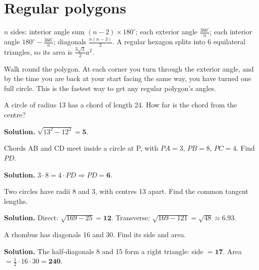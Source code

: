 \documentclass[11pt,a4paper,openany]{report}
\begin{document}
\section{Regular polygons}
$n$ sides: interior angle sum $(n-2)\times180^\circ$; each exterior angle $\frac{360^\circ}n$; each interior angle $180^\circ-\frac{360^\circ}n$; diagonals $\frac{n(n-3)}2$. A regular hexagon splits into 6 equilateral triangles, so its area is $\frac{3\sqrt3}2a^2$.

\begin{why}
Walk round the polygon. At each corner you turn through the exterior angle, and by the time you are back at your start facing the same way, you have turned one full circle. This is the fastest way to get any regular polygon's angles.
\end{why}

\begin{example}[chord]
A circle of radius 13 has a chord of length 24. How far is the chord from the centre?

\textbf{Solution.} $\sqrt{13^2-12^2}=\mathbf{5}$.
\end{example}

\begin{example}
Chords AB and CD meet inside a circle at P, with $PA=3$, $PB=8$, $PC=4$. Find $PD$.

\textbf{Solution.} $3\cdot8=4\cdot PD\Rightarrow PD=\mathbf{6}$.
\end{example}

\begin{example}
Two circles have radii 8 and 3, with centres 13 apart. Find the common tangent lengths.

\textbf{Solution.} Direct: $\sqrt{169-25}=\mathbf{12}$. Transverse: $\sqrt{169-121}=\sqrt{48}\approx\mathbf{6.93}$.
\end{example}

\begin{example}[rhombus]
A rhombus has diagonals 16 and 30. Find its side and area.

\textbf{Solution.} The half-diagonals 8 and 15 form a right triangle: side $=\mathbf{17}$. Area $=\frac12\cdot16\cdot30=\mathbf{240}$.
\end{example}
\end{document}
